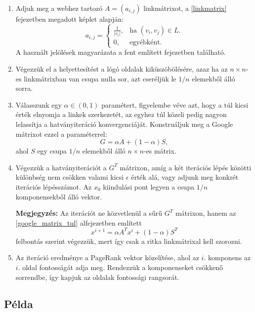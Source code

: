 \documentclass[12pt,a4paper]{article}
\begin{document}
\begin{enumerate}[label=(\Roman*)]
	\item Adjuk meg a webhez tartozó $A = (a_{i,j})$ linkmátrixot, a \ref{linkmatrix} fejezetben megadott képlet alapján: 
	\begin{equation*}
	a_{i,j}=\begin{cases}
	\frac{1}{ |v_i| }, & \text{ha $(v_i,v_j) \in L$}.\\
	0, & \text{egyébként}.
	\end{cases}
	\end{equation*}
	A használt jelölések magyarázata a fent említett fejezetben található.
	
	\item Végezzük el a helyettesítést a lógó oldalak kiküszöbölésére, azaz ha az $n \times n$-es linkmátrixban van csupa nulla sor, azt cseréljük le $1/n$ elemekből álló sorra.
	
	\item Válasszunk egy $\alpha \in (0,1)$ paramétert, figyelembe véve azt, hogy a túl kicsi érték elnyomja a linkek szerkezetét, az egyhez túl közeli pedig nagyon lelassítja a hatványiteráció konvergenciáját. Konstruáljuk meg a Google mátrixot ezzel a paraméterrel:
	\[G = \alpha A + (1-\alpha)S,\]
	ahol $S$ egy csupa $1/n$ elemekből álló $n \times n$-es mátrix. 
	
	\item Végezzük a hatványiterációt a $G^T$ mátrixon, amíg a két iterációs lépés közötti különbség nem csökken valami kicsi $\epsilon$ érték alá, vagy adjunk meg konkrét iterációs lépésszámot. Az $x_0$ kiindulási pont legyen a csupa $1/n$ komponensekből álló vektor.
	
	\textbf{Megjegyzés:} Az iterációt ne közvetlenül a sűrű $G^T$ mátrixon, hanem az \ref{google_matrix_tul} alfejezetben említett
	\[ x^{i+1} = \alpha A^T x^i + (1-\alpha) S^T \] 
	felbontás szerint végezzük, mert így csak a ritka linkmátrixal kell szorozni.
	
	\item Az iteráció eredménye a PageRank vektor közelítése, ahol az $i.$ komponens az $i.$ oldal fontosságát adja meg. Rendezzük a komponenseket csökkenő sorrendbe, így kapjuk az oldalak fontossági rangsorát.
	
\end{enumerate}

\subsection{Példa}
\end{document}
